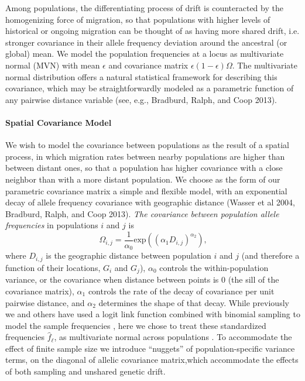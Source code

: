 \documentclass[12pt]{article}
\newcommand{\gc}[1]{{\em \color{blue} #1}}
\begin{document}
Among populations, the differentiating process of drift is counteracted by the homogenizing force of migration, so that populations with higher levels of historical or ongoing migration can be thought of as having more shared drift, i.e. stronger covariance in their allele frequency deviation around the ancestral (or global) mean. We model the population frequencies at a locus as multivariate normal (MVN) with mean $\epsilon$ and covariance matrix $\epsilon (1-\epsilon)\Omega$. The multivariate normal distribution offers a natural statistical framework for describing this covariance, which may be straightforwardly modeled as a parametric function of any pairwise distance variable (see, e.g., Bradburd, Ralph, and Coop 2013). 


\paragraph{Spatial Covariance Model}
We wish to model the covariance between populations as the result of a spatial process, in which migration rates between nearby populations are higher than between distant ones, so that a population has higher covariance with a close neighbor than with a more distant population.  We choose as the form of our parametric covariance matrix a simple and flexible model, with an exponential decay of allele frequency covariance with geographic distance (Wasser et al 2004, Bradburd, Ralph, and Coop 2013).  \gc{The covariance between population allele frequencies} in populations $i$ and $j$ is 
\begin{equation}
\label{eq:spatial_covariance}
\Omega_{i,j} = \frac{1}{\alpha_0} \text{exp} \left(	\left( \alpha_1D_{i,j} \right)^{\alpha_2} \right) \text{,}
\end{equation}
where $D_{i,j}$ is the geographic distance between population $i$ and $j$ (and therefore a function of their locations, $G_i$ and $G_j$), $\alpha_0$ controls the within-population variance, or the covariance when distance between points is 0 (the sill of the covariance matrix),  $\alpha_1$ controls the rate of the decay of covariance per unit pairwise distance, and $\alpha_2$ determines the shape of that decay. While previously we and others have used a logit link function combined with binomial sampling to model the sample frequencies \citep{Wasser, Bradburd}, here we chose to treat these standardized frequencies $\hat{f}_{\ell}$, as multivariate normal across populations \citep[]{Treemix}. To accommodate the effect of finite sample size we introduce ``nuggets'' of population-specific variance terms, on the diagonal of allelic covariance matrix,which accommodate the effects of both sampling and unshared genetic drift.
\end{document}
